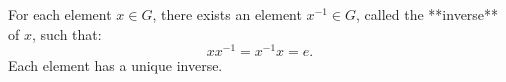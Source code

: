 For each element $x \in G$, there exists an element $x^{-1} \in G$, called the **inverse** of $x$, such that:
$$xx^{-1} = x^{-1}x = e.$$
Each element has a unique inverse.
